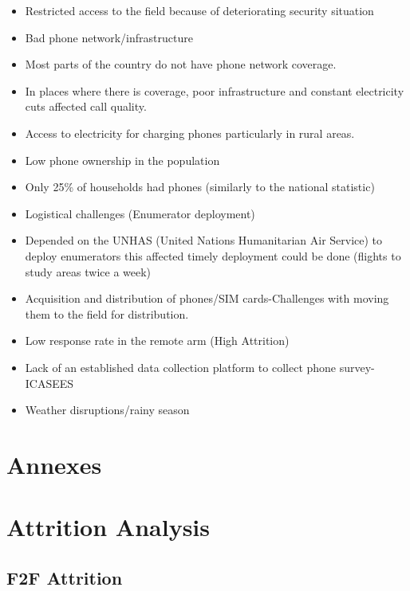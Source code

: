 \documentclass[11pt,harvard]{article}
\begin{document}
	\begin{itemize}[label=--, left=1.5em]
		\item[1.] Restricted access to the field because of deteriorating security situation
		\item[2.] Bad phone network/infrastructure 
			\item[a.]	Most parts of the country do not have phone network coverage.
			\item[b.]	In places where there is coverage, poor infrastructure and constant electricity cuts affected call quality.
			\item[c.]	Access to electricity for charging phones particularly in rural areas.
		\item[3.] Low phone ownership in the population
			\item[a.] 	Only 25\% of households had phones (similarly to the national statistic)
		\item[4] Logistical challenges (Enumerator deployment)
			\item[a.]	Depended on the UNHAS (United Nations Humanitarian Air Service) to deploy enumerators this affected timely deployment could be done (flights to study areas twice a week)
			\item[b.]	Acquisition and distribution of phones/SIM cards-Challenges with moving them to the field for distribution.
		\item[5.] Low response rate in the remote arm (High Attrition)
		\item[6.] Lack of an established data collection platform to collect phone survey-ICASEES 
		\item[7.] Weather disruptions/rainy season
	\end{itemize}


\pagebreak



\section{Annexes}

\section{Attrition Analysis}

\subsection{F2F Attrition}
\end{document}
